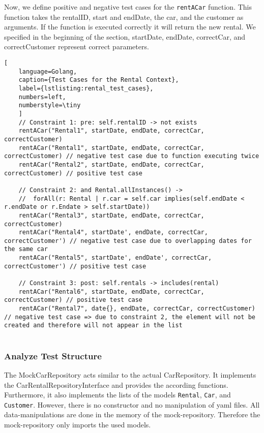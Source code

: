 Now, we define positive and negative test cases for the \texttt{rentACar\(\)} function.
This function takes the rentalID, start and endDate, the car, and the customer as arguments.
If the function is executed correctly it will return the new rental.
We specified in the beginning of the section, startDate, endDate, correctCar, and correctCustomer represent correct parameters.

\begin{lstlisting}[
    language=Golang,
    caption={Test Cases for the Rental Context},
    label={lstlisting:rental_test_cases},
    numbers=left,
    numberstyle=\tiny
    ]
    // Constraint 1: pre: self.rentalID -> not exists
    rentACar("Rental1", startDate, endDate, correctCar, correctCustomer)
    rentACar("Rental1", startDate, endDate, correctCar, correctCustomer) // negative test case due to function executing twice
    rentACar("Rental2", startDate, endDate, correctCar, correctCustomer) // positive test case

    // Constraint 2: and Rental.allInstances() -> 
    //  forAll(r: Rental | r.car = self.car implies(self.endDate < r.endDate or r.Endate > self.startDate))
    rentACar("Rental3", startDate, endDate, correctCar, correctCustomer)
    rentACar("Rental4", startDate', endDate, correctCar, correctCustomer') // negative test case due to overlapping dates for the same car
    rentACar("Rental5", startDate', endDate', correctCar, correctCustomer') // positive test case 

    // Constraint 3: post: self.rentals -> includes(rental)
    rentACar("Rental6", startDate, endDate, correctCar, correctCustomer) // positive test case
    rentACar("Rental7", date{}, endDate, correctCar, correctCustomer) // negative test case => due to constraint 2, the element will not be created and therefore will not appear in the list
    
\end{lstlisting}

\subsubsection*{Analyze Test Structure}
The MockCarRepository acts similar to the actual CarRepository.
It implements the CarRentalRepositoryInterface and provides the according functions.
Furthermore, it also implements the lists of the models \texttt{Rental}, \texttt{Car}, and \texttt{Customer}.
However, there is no constructor and no manipulation of yaml files.
All data-manipulations are done in the memory of the mock-repository.
Therefore the mock-repository only imports the used models.

